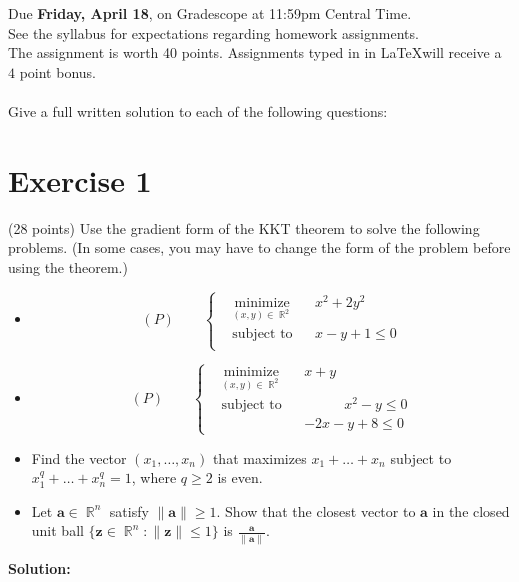 \documentclass{article}
\DeclareMathOperator{\R}{\mathbb R}
\newcommand{\mb}{\mathbf}
\begin{document}
\noindent
Due \textbf{Friday, April 18}, on Gradescope at 11:59pm Central Time. \\
See the syllabus for expectations regarding homework assignments. \\
The assignment is worth 40 points. Assignments typed in in \LaTeX will receive a $4$ point bonus. \\ \\
Give a full written solution to each of the following questions:

\section*{Exercise 1}
(28 points) Use the gradient form of the KKT theorem to solve the following problems. (In some cases, you may have to change the form of the problem before using the theorem.)
\begin{itemize}
\item \begin{equation*}
(P)\qquad\left\{\begin{aligned}
& \underset{  (x,y) \in \R^2}{\text{minimize}}
& & x^2 + 2y^2 \\
& \text{subject to} && x-y+1 \leq 0 \\
\end{aligned}\right.
\end{equation*}
\item \begin{equation*}
(P)\qquad\left\{\begin{aligned}
& \underset{  (x,y) \in \R^2}{\text{minimize}}
& & x+y \\
& \text{subject to} && \phantom{xxxxx} x^2 - y \leq 0 \\
& && -2x-y+8 \leq 0
\end{aligned}\right.
\end{equation*}
\item Find the vector $(x_1, \dots, x_n)$ that maximizes $x_1 + \dots + x_n$ subject to $x_1^q + \dots + x_n^q = 1$, where $q \geq2$ is even.
\item Let $\mb a \in \R^n$ satisfy $\|\mb a\| \geq 1$. Show that the closest vector to $\mb a$ in the closed unit ball $\{\mb z \in \R^n: \|\mb z \| \leq 1\}$ is $\frac{\mb a}{\|\mb a\|}$.
\end{itemize}

\textbf{Solution:} \\



\newpage
\end{document}
